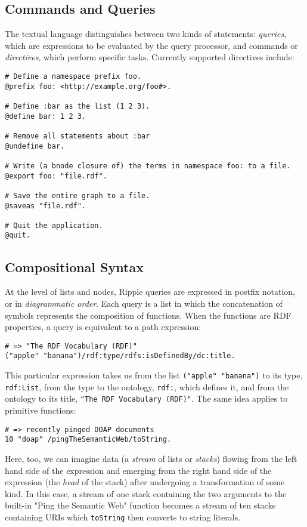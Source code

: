 \documentclass[runningheads]{llncs}
\begin{document}
\subsection{Commands and Queries}
The textual language distinguishes between two kinds of statements: \textit{queries}, which are expressions to be evaluated by the query processor, and commands or \textit{directives}, which perform specific tasks.  Currently supported directives include:
\newline
\begin{verbatim}
# Define a namespace prefix foo.
@prefix foo: <http://example.org/foo#>.

# Define :bar as the list (1 2 3).
@define bar: 1 2 3.

# Remove all statements about :bar
@undefine bar.

# Write (a bnode closure of) the terms in namespace foo: to a file.
@export foo: "file.rdf".

# Save the entire graph to a file.
@saveas "file.rdf".

# Quit the application.
@quit.
\end{verbatim}


\subsection{Compositional Syntax}
At the level of lists and nodes, Ripple queries are expressed in postfix notation, or in \textit{diagrammatic order}.  Each query is a list in which the concatenation of symbols represents the composition of functions.  When the functions are RDF properties, a query is equivalent to a path expression:
\begin{verbatim}
# => "The RDF Vocabulary (RDF)"
("apple" "banana")/rdf:type/rdfs:isDefinedBy/dc:title.
\end{verbatim}

This particular expression takes us from the list \texttt{("apple" "banana")} to its type, \texttt{rdf:List}, from the type to the ontology, \texttt{rdf:}, which defines it, and from the ontology to its title, \texttt{"The RDF Vocabulary (RDF)"}.  The same idea applies to primitive functions:
\begin{verbatim}
# => recently pinged DOAP documents
10 "doap" /pingTheSemanticWeb/toString.
\end{verbatim}

Here, too, we can imagine data (a \textit{stream} of lists or \textit{stacks}) flowing from the left hand side of the expression and emerging from the right hand side of the expression (the \textit{head} of the stack) after undergoing a transformation of some kind.  In this case, a stream of one stack containing the two arguments to the built-in "Ping the Semantic Web" function becomes a stream of ten stacks containing URIs which \texttt{toString} then converts to string literals.
\end{document}
